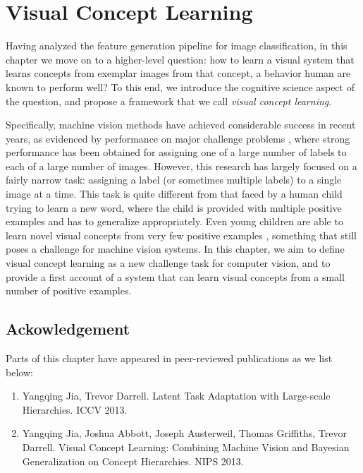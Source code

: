 \chapter{Visual Concept Learning}

Having analyzed the feature generation pipeline for image classification, in this chapter we move on to a higher-level question: how to learn a visual system that learns concepts from exemplar images from that concept, a behavior human are known to perform well? To this end, we introduce the cognitive science aspect of the question, and propose a framework that we call \emph{visual concept learning}.

Specifically, machine vision methods have achieved considerable success in recent years, as evidenced by performance on major challenge problems \cite{imagenet,pascal}, where strong performance has been obtained for assigning one of a large number of labels to each of a large number of images. However, this research has largely focused on a fairly narrow task: assigning a label (or sometimes multiple labels) to a single image at a time. This task is quite different from that faced by a human child trying to learn a new word, where the child is provided with multiple positive examples and has to generalize appropriately. Even young children are able to learn novel visual concepts from very few positive examples \cite{carey1978}, something that still poses a challenge for machine vision systems. In this chapter, we aim to define visual concept learning
as a new challenge task for computer vision, and to provide a first account of a system that can learn visual concepts from a small number of positive examples.






\section*{Ackowledgement}
Parts of this chapter have appeared in peer-reviewed publications as we list below:
\begin{enumerate}
\item Yangqing Jia, Trevor Darrell. Latent Task Adaptation with Large-scale Hierarchies. ICCV 2013.
\item Yangqing Jia, Joshua Abbott, Joseph Austerweil, Thomas Griffiths, Trevor Darrell. Visual Concept Learning: Combining Machine Vision and Bayesian Generalization on Concept Hierarchies. NIPS 2013.
\end{enumerate}